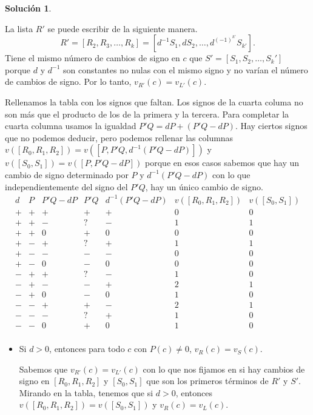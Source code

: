 \documentclass[10pt]{article}
\theoremstyle{definition}
\newtheorem*{sol}{Solución}
\begin{document}
\begin{sol}
\begin{itemize}
    La lista $R'$ se puede escribir de la siguiente manera. \[R'=[R_2,R_3,\ldots,R_k]=[d^{-1}S_1,dS_2,\ldots,d^{(-1)^{k'}}S_{k'}].\]
    Tiene el mismo número de cambios de signo en $c$ que $S'=[S_1,S_2,\ldots, S_k']$ porque $d$ y $d^{-1}$ son constantes no nulas con el mismo signo y no varían el número de cambios de signo. Por lo tanto, $v_{R'}(c)=v_{L'}(c)$.
\end{itemize}
Rellenamos la tabla con los signos que faltan. Los signos de la cuarta columa no son más que el producto de los de la primera y la tercera. Para completar la cuarta columna usamos la igualdad $P'Q = dP+(P'Q-dP)$. Hay ciertos signos que no podemos deducir, pero podemos rellenar las columnas $v([R_0,R_1,R_2])=v([P,P'Q,d^{-1}(P'Q-dP)])$ y $v([S_0,S_1])=v([P,P'Q-dP])$ porque en esos casos sabemos que hay un cambio de signo determinado por $P$ y $d^{-1}(P'Q-dP)$ con lo que independientemente del signo del $P'Q$, hay un único cambio de signo.
\[\begin{array}{c|c|c|c|c|c|c}
    d & P & P'Q-dP & P'Q & d^{-1}(P'Q-dP) & v([R_0,R_1,R_2]) & v([S_0,S_1])\\
    + & + & + & + & + & 0 & 0\\
    + & + & - & ? & - & 1 & 1\\
    + & + & 0 & + & 0 & 0 & 0\\
    + & - & + & ? & + & 1 & 1\\
    + & - & - & - & - & 0 & 0\\
    + & - & 0 & - & 0 & 0 & 0\\
    - & + & + & ? & - & 1 & 0\\
    - & + & - & - & + & 2 & 1\\
    - & + & 0 & - & 0 & 1 & 0\\
    - & - & + & + & - & 2 & 1\\
    - & - & - & ? & + & 1 & 0\\
    - & - & 0 & + & 0 & 1 & 0\\
\end{array}\]
\begin{itemize}
    \item Si $d>0$, entonces para todo $c$ con $P(c)\neq 0$, $v_R(c)=v_S(c)$.
    
    Sabemos que $v_{R'}(c)=v_{L'}(c)$ con lo que nos fijamos en si hay cambios de signo en $[R_0,R_1,R_2]$ y $[S_0,S_1]$ que son los primeros términos de $R'$ y $S'$. Mirando en la tabla, tenemos que si $d>0$, entonces $v([R_0,R_1,R_2])=v([S_0,S_1])$ y $v_R(c)=v_L(c)$. 
    

\end{itemize}
\end{sol}
\end{document}
